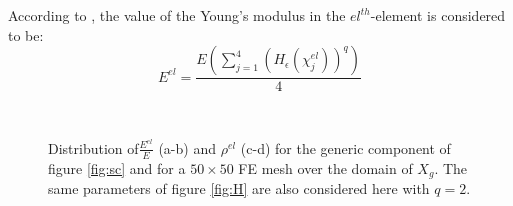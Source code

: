 According to \cite{guo2005new}, the value of the Young's modulus in the $el^{th}$-element is considered to be:
\begin{equation}
\label{eq:EMMC}
    E^{el}=\frac{E\left(\sum_{j=1}^4(H_{\epsilon}(\chi_j^{el}))^q\right)}{4}
\end{equation}
\begin{figure}[!ht]
\centering
    \quad
    \\
     \quad
    \caption{Distribution of$\frac{ E^{el}}{E}$ (a-b) and $ \rho^{el}$ (c-d)  for the generic component of figure \ref{fig:sc} and for a $50\times50$ FE mesh over the domain of $X_g$. The same parameters of figure \ref{fig:H} are also considered here with $q=2$. }%
\end{figure}
